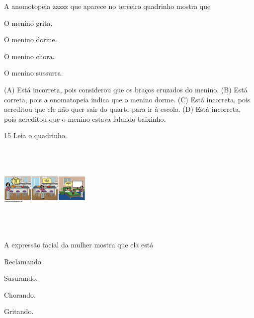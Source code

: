 
A anomotopeia zzzzz que aparece no terceiro quadrinho mostra que

\begin{minipage}{.5\textwidth}
\begin{escolha}
\item O menino grita.

\item O menino dorme.

\item O menino chora.

\item O menino sussurra.
\end{escolha}
\end{minipage}

(A) Está incorreta, pois considerou que os braços cruzados do menino.
(B) Está correta, pois a onomatopeia indica que o menino dorme.
(C) Está incorreta, pois acreditou que ele não quer sair do quarto para ir à escola.
(D) Está incorreta, pois acreditou que o menino estava falando baixinho.

\num{15} Leia o quadrinho.

\includegraphics[width=1.70556in,height=1.74444in]{media/image146.png}


A expressão facial da mulher mostra que ela está

\begin{minipage}{.5\textwidth}
\begin{escolha}
\item Reclamando.

\item Susurando.

\item Chorando.

\item Gritando.
\end{escolha}
\end{minipage}

